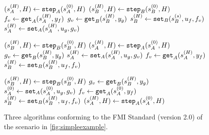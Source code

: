 \begin{figure}[htb]
  \centering
  \begin{minipage}[t]{.325\textwidth}
    \begin{algorithm}[H]
      \caption{}
      \label{alg:algorithm_1}
      \begin{algorithmic}[1]
        \scriptsize
        \State $(s_{A}^{(H)},H) \gets \mathtt{step}_{A}(s_{A}^{(0)}, H)$
        \State $(s_{B}^{(H)},H) \gets \mathtt{step}_{B}(s_{B}^{(0)}, H)$
        \State $f_{v} \gets \mathtt{get}_{A}(s_{A}^{(H)}, y_{f})$
        \State $g_{v} \gets \mathtt{get}_{B}(s_{B}^{(H)}, y_{g})$
        \State $s_{B}^{(H)} \gets \mathtt{set}_{B}(s_{B}^{(s)}, u_{f}, f_{v})$
        \State $s_{A}^{(H)} \gets \mathtt{set}_{A}(s_{A}^{(H)},u_{g},g_{v})$
      \end{algorithmic}
    \end{algorithm}
  \end{minipage}
  \begin{minipage}[t]{0.325\textwidth}
    \begin{algorithm}[H]
      \caption{}
      \label{alg:algorithm_2}
      \begin{algorithmic}[1]
        \scriptsize
        \State $(s_{B}^{(H)},H) \gets \mathtt{step}_{B}(s_{B}^{(0)}, H)$
        \State $(s_{A}^{(H)},H) \gets \mathtt{step}_{A}(s_{A}^{(0)}, H)$
        \State $g_v \gets \mathtt{get}_{B}(s_{B}^{(H)}, y_{g})$
        \State $s_{A}^{(H)} \gets \mathtt{set}_{A}(s_{A}^{(H)}, u_{g}, g_v)$
        \State $f_v \gets \mathtt{get}_{A}(s_{A}^{(H)}, y_{f})$
        \State $s_{B}^{(H)} \gets \mathtt{set}_{B}(s_{B}^{(H)}, u_{f}, f_v)$
      \end{algorithmic}
    \end{algorithm}
  \end{minipage}
  \begin{minipage}[t]{0.325\textwidth}
    \begin{algorithm}[H]
      \caption{}
      \label{alg:algorithm_3}
      \begin{algorithmic}[1]
        \scriptsize
        \State $(s_{B}^{(H)},H) \gets \mathtt{step}_{B}(s_{B}^{(0)}, H)$
        \State $g_v \gets \mathtt{get}_{B}(s_{B}^{(H)}, y_{g})$
        \State $s_{A}^{(0)} \gets \mathtt{set}_{A}(s_{A}^{(0)}, u_{g}, g_v)$
        \State $f_v \gets \mathtt{get}_{A}(s_{A}^{(0)}, y_{f})$
        \State $s_{B}^{(H)} \gets \mathtt{set}_{B}(s_{B}^{(H)}, u_{f}, f_v)$
        \State $(s_{A}^{(H)},H) \gets \mathtt{step}_{A}(s_{A}^{(0)}, H)$
      \end{algorithmic}
    \end{algorithm}
    \vspace{4pt}
  \end{minipage}
  \caption{Three algorithms conforming to the FMI Standard (version 2.0) of the scenario in \cref{fig:simpleexample}.}
  \label{fig:algorithms}
\end{figure}

